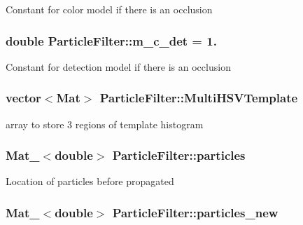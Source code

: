 Constant for color model if there is an occlusion \hypertarget{classParticleFilter_af4f11088b2a93f38f9f1719a734032cc}{
\subsubsection[{m\-\_\-c\-\_\-det}]{\setlength{\rightskip}{0pt plus 5cm}double Particle\-Filter\-::m\-\_\-c\-\_\-det = 1.\hspace{0.3cm}{\ttfamily [protected]}}}\label{classParticleFilter_af4f11088b2a93f38f9f1719a734032cc}
Constant for detection model if there is an occlusion \hypertarget{classParticleFilter_a83d30593ad7fb15decdc3ed135dcde0c}{
\subsubsection[{Multi\-H\-S\-V\-Template}]{\setlength{\rightskip}{0pt plus 5cm}vector$<$Mat$>$ Particle\-Filter\-::\-Multi\-H\-S\-V\-Template\hspace{0.3cm}{\ttfamily [protected]}}}\label{classParticleFilter_a83d30593ad7fb15decdc3ed135dcde0c}
array to store 3 regions of template histogram \hypertarget{classParticleFilter_ae9823740efabda90ff9c24b7b8f91dc5}{
\subsubsection[{particles}]{\setlength{\rightskip}{0pt plus 5cm}Mat\-\_\-$<$double$>$ Particle\-Filter\-::particles\hspace{0.3cm}{\ttfamily [protected]}}}\label{classParticleFilter_ae9823740efabda90ff9c24b7b8f91dc5}
Location of particles before propagated \hypertarget{classParticleFilter_ab006458e205d5d2f6e6f554ee5abfe81}{
\subsubsection[{particles\-\_\-new}]{\setlength{\rightskip}{0pt plus 5cm}Mat\-\_\-$<$double$>$ Particle\-Filter\-::particles\-\_\-new\hspace{0.3cm}{\ttfamily [protected]}}}\label{classParticleFilter_ab006458e205d5d2f6e6f554ee5abfe81}
